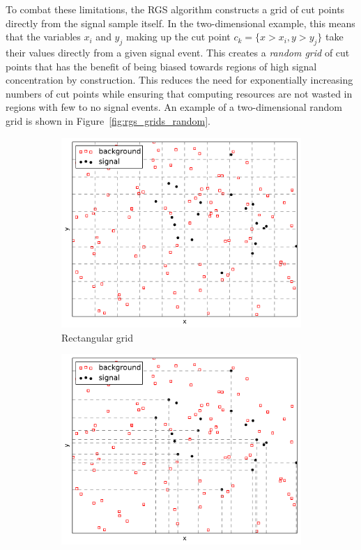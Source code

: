 To combat these limitations, the RGS algorithm constructs a grid of cut points directly from the signal sample itself.
In the two-dimensional example, this means that the variables $x_i$ and $y_j$ making up the cut point $c_k = \{x > x_i, y > y_j\}$ take their values directly from a given signal event.
This creates a \emph{random grid} of cut points that has the benefit of being biased towards regions of high signal concentration by construction.
This reduces the need for exponentially increasing numbers of cut points while ensuring that computing resources are not wasted in regions with few to no signal events.
An example of a two-dimensional random grid is shown in Figure~\ref{fig:rgs_grids_random}.

\begin{figure}[htp]
  \centering
  \begin{subfigure}[b]{.48\textwidth}
    \includegraphics[width=\textwidth]{figs/ssww_upgrade/rgs/square_grid-cropped}
    \caption{Rectangular grid}
    \label{fig:rgs_grids_rectangular}
  \end{subfigure}
  \begin{subfigure}[b]{.48\textwidth}
    \includegraphics[width=\textwidth]{figs/ssww_upgrade/rgs/random_grid-cropped}

\end{subfigure}
\end{figure}
